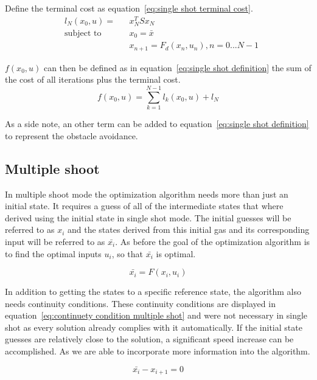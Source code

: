 			Define the terminal cost as equation~\ref{eq:single shot terminal cost}.
			\begin{equation}
			\begin{aligned}
			& l_N(x_0,u) = && x_N^TSx_N \\
			& \text{subject to}			&& x_0 = \bar{x} \\
			& 							&&  x_{n+1} = F_d(x_n,u_n), n=0...N-1
			\end{aligned}
			\label{eq:single shot terminal cost}
			\end{equation}
			
			$f(x_0,u)$ can then be defined as in equation~\ref{eq:single shot definition} the sum of the cost of all iterations plus the terminal cost.
			\begin{equation}
				f(x_0,u) = \sum_{k=1}^{N-1} l_k(x_0,u) + l_N
				\label{eq:single shot definition}
			\end{equation}
			
			As a side note, an other term can be added to equation~\ref{eq:single shot definition} to represent the obstacle avoidance.
		\subsection{Multiple shoot}
			In multiple shoot mode the optimization algorithm needs more than just an initial state. It requires a guess of all of the intermediate states that where derived using the initial state in  single shot mode. The initial guesses will be referred to as $x_i$ and the states derived from this initial gas and its corresponding input will be referred to as $\bar{x_i}$. As before the goal of the optimization algorithm is to find the optimal inputs $u_i$, so that $\bar{x_i}$ is optimal.
			
			\begin{equation}
				\bar{x_i} = F(x_i,u_i)
				\label{eq:}
			\end{equation}
			
			In addition to getting the states to a specific reference state, the algorithm also needs continuity conditions. These continuity conditions are displayed in equation~\ref{eq:continuety condition multiple shot} and were not necessary in single shot as every solution already complies with it automatically. If the initial state guesses are relatively close to the solution, a significant speed increase can be accomplished. As we are able to incorporate more information into the algorithm.
			
			\begin{equation}
				\bar{x_i} - x_{i+1} = 0
				\label{eq:continuety condition multiple shot}
			\end{equation}
			
